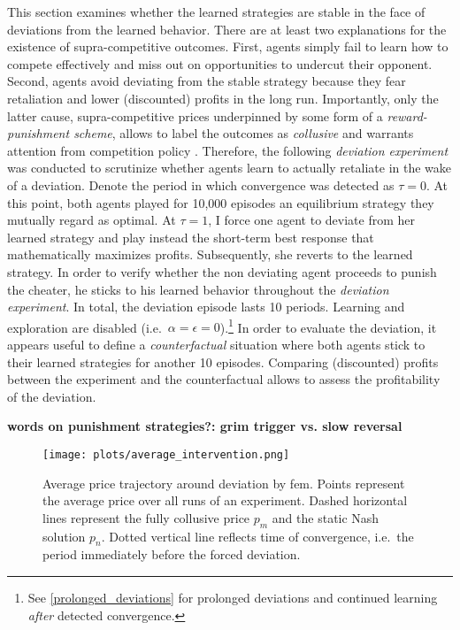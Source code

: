 This section examines whether the learned strategies are stable in the face of deviations from the learned behavior. There are at least two explanations for the existence of supra-competitive outcomes. First, agents simply fail to learn how to compete effectively and miss out on opportunities to undercut their opponent. Second, agents avoid deviating from the stable strategy because they fear retaliation and lower (discounted) profits in the long run. Importantly, only the latter cause, supra-competitive prices underpinned by some form of a \emph{reward-punishment scheme}, allows to label the outcomes as \emph{collusive} and warrants attention from competition policy \parencite{assad_algorithmic_2020}. Therefore, the following \emph{deviation experiment} was conducted to scrutinize whether agents learn to actually retaliate in the wake of a deviation. Denote the period in which convergence was detected as $\tau = 0$. At this point, both agents played for 10,000 episodes an equilibrium strategy they mutually regard as optimal. At $\tau = 1$, I force one agent to deviate from her learned strategy and play instead the short-term best response that mathematically maximizes profits. Subsequently, she reverts to the learned strategy. In order to verify whether the non deviating agent proceeds to punish the cheater, he sticks to his learned behavior throughout the \emph{deviation experiment}. In total, the deviation episode lasts 10 periods. Learning and exploration are disabled (i.e.\ $\alpha = \epsilon = 0$).\footnote{See \autoref{prolonged_deviations} for prolonged deviations and continued learning \emph{after} detected convergence.} In order to evaluate the deviation, it appears useful to define a \emph{counterfactual} situation where both agents stick to their learned strategies for another 10 episodes. Comparing (discounted) profits between the experiment and the counterfactual allows to assess the profitability of the deviation.

\textbf{words on punishment strategies?: grim trigger vs. slow reversal }

\begin{figure}
	\texttt{[image: plots/average\_intervention.png]}
	\caption[Average price trajectory around deviation by \gls{fem}]{Average price trajectory around deviation by \gls{fem}. Points represent the average price over all runs of an experiment. Dashed horizontal lines represent the fully collusive price $p_m$ and the static Nash solution $p_n$. Dotted vertical line reflects time of convergence, i.e.\ the period immediately before the forced deviation.}
	\label{average_intervention}
\end{figure}

